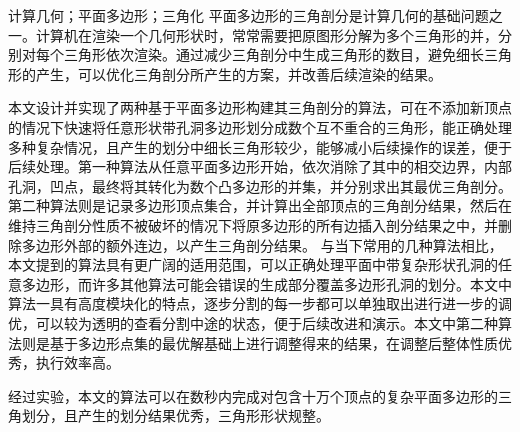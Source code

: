 
\begin{cnabstract}{计算几何；平面多边形；三角化}
  平面多边形的三角剖分是计算几何的基础问题之一。计算机在渲染一个几何形状时，常常需要把原图形分解为多个三角形的并，分别对每个三角形依次渲染。通过减少三角剖分中生成三角形的数目，避免细长三角形的产生，可以优化三角剖分所产生的方案，并改善后续渲染的结果。

  本文设计并实现了两种基于平面多边形构建其三角剖分的算法，可在不添加新顶点的情况下快速将任意形状带孔洞多边形划分成数个互不重合的三角形，能正确处理多种复杂情况，且产生的划分中细长三角形较少，能够减小后续操作的误差，便于后续处理。第一种算法从任意平面多边形开始，依次消除了其中的相交边界，内部孔洞，凹点，最终将其转化为数个凸多边形的并集，并分别求出其最优三角剖分。第二种算法则是记录多边形顶点集合，并计算出全部顶点的三角剖分结果，然后在维持三角剖分性质不被破坏的情况下将原多边形的所有边插入剖分结果之中，并删除多边形外部的额外连边，以产生三角剖分结果。
  与当下常用的几种算法相比，本文提到的算法具有更广阔的适用范围，可以正确处理平面中带复杂形状孔洞的任意多边形，而许多其他算法可能会错误的生成部分覆盖多边形孔洞的划分。本文中算法一具有高度模块化的特点，逐步分割的每一步都可以单独取出进行进一步的调优，可以较为透明的查看分割中途的状态，便于后续改进和演示。本文中第二种算法则是基于多边形点集的最优解基础上进行调整得来的结果，在调整后整体性质优秀，执行效率高。

  经过实验，本文的算法可以在数秒内完成对包含十万个顶点的复杂平面多边形的三角划分，且产生的划分结果优秀，三角形形状规整。
  
\end{cnabstract}




